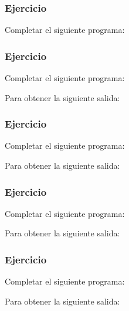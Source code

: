 \subsubsection{Ejercicio}
Completar el siguiente programa:

\lstset{inputencoding=utf8/latin1}

{\small
  \lstset{inputencoding=utf8/latin1}
  
}

\subsubsection{Ejercicio}
Completar el siguiente programa:
\lstset{inputencoding=utf8/latin1}

Para obtener la siguiente salida:
{\small
  \lstset{inputencoding=utf8/latin1}
  
}

\subsubsection{Ejercicio}
Completar el siguiente programa:
\lstset{inputencoding=utf8/latin1}

Para obtener la siguiente salida:
{\small
  \lstset{inputencoding=utf8/latin1}
  
}

\subsubsection{Ejercicio}
Completar el siguiente programa:
\lstset{inputencoding=utf8/latin1}

Para obtener la siguiente salida:
{\small
  \lstset{inputencoding=utf8/latin1}
  
}

\subsubsection{Ejercicio}
Completar el siguiente programa:
\lstset{inputencoding=utf8/latin1}

Para obtener la siguiente salida:
{\small
  \lstset{inputencoding=utf8/latin1}
  
}


